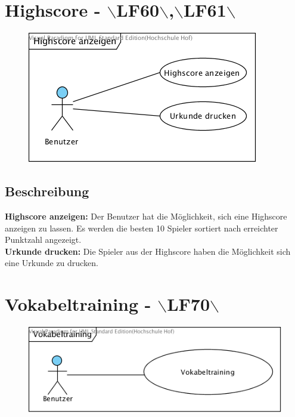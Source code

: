 \clearpage
\section{Highscore - $\backslash$LF60$\backslash$,$\backslash$LF61$\backslash$}
\begin{figure}[!h]
	\centering
    \includegraphics[width=\textwidth]{./Highscore.png}
	\label{layout_gesamt}
\end{figure}

\subsection{Beschreibung}
\textbf{Highscore anzeigen: } Der Benutzer hat die Möglichkeit, sich eine Highscore anzeigen zu lassen. Es werden die besten 10 Spieler sortiert nach erreichter Punktzahl angezeigt.\\
\textbf{Urkunde drucken: } Die Spieler aus der Highscore haben die Möglichkeit sich eine Urkunde zu drucken.

\clearpage
\section{Vokabeltraining - $\backslash$LF70$\backslash$}
\begin{figure}[!h]
	\centering
    \includegraphics[width=\textwidth]{./Vokabeltraining.png}
	\label{layout_gesamt}
\end{figure}

